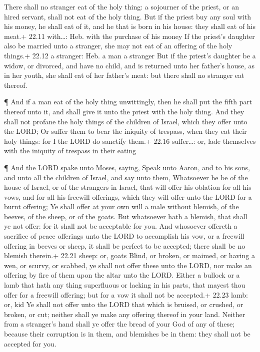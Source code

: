  There shall no stranger eat of the holy thing: a sojourner
of the priest, or an hired servant, shall not eat of the holy thing.
 But if the priest buy any soul with his money, he shall
eat of it, and he that is born in his house: they shall eat of his
meat.+ 22.11 with\ldots: Heb. with the purchase of his money
 If the priest's daughter also be married unto a stranger,
she may not eat of an offering of the holy things.+ 22.12 a stranger:
Heb. a man a stranger  But if the priest's daughter be a
widow, or divorced, and have no child, and is returned unto her father's
house, as in her youth, she shall eat of her father's meat: but there
shall no stranger eat thereof.

 ¶ And if a man eat of the holy thing unwittingly, then he
shall put the fifth part thereof unto it, and shall give it unto the
priest with the holy thing.  And they shall not profane the
holy things of the children of Israel, which they offer unto the LORD;
 Or suffer them to bear the iniquity of trespass, when they
eat their holy things: for I the LORD do sanctify them.+ 22.16
suffer\ldots: or, lade themselves with the iniquity of trespass in their
eating

 ¶ And the LORD spake unto Moses, saying, 
Speak unto Aaron, and to his sons, and unto all the children of Israel,
and say unto them, Whatsoever he be of the house of Israel, or of the
strangers in Israel, that will offer his oblation for all his vows, and
for all his freewill offerings, which they will offer unto the LORD for
a burnt offering;  Ye shall offer at your own will a male
without blemish, of the beeves, of the sheep, or of the goats.
 But whatsoever hath a blemish, that shall ye not offer:
for it shall not be acceptable for you.  And whosoever
offereth a sacrifice of peace offerings unto the LORD to accomplish his
vow, or a freewill offering in beeves or sheep, it shall be perfect to
be accepted; there shall be no blemish therein.+ 22.21 sheep: or, goats
 Blind, or broken, or maimed, or having a wen, or scurvy,
or scabbed, ye shall not offer these unto the LORD, nor make an offering
by fire of them upon the altar unto the LORD.  Either a
bullock or a lamb that hath any thing superfluous or lacking in his
parts, that mayest thou offer for a freewill offering; but for a vow it
shall not be accepted.+ 22.23 lamb: or, kid  Ye shall not
offer unto the LORD that which is bruised, or crushed, or broken, or
cut; neither shall ye make any offering thereof in your land.
 Neither from a stranger's hand shall ye offer the bread of
your God of any of these; because their corruption is in them, and
blemishes be in them: they shall not be accepted for you.

